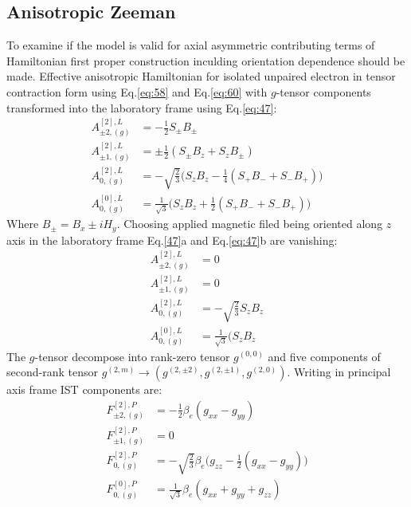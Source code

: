 \subsection{Anisotropic Zeeman}\label{zeemansection}
To examine if the model is valid for axial asymmetric contributing terms of Hamiltonian first proper construction inculding orientation dependence should be made. Effective anisotropic Hamiltonian for isolated unpaired electron in tensor contraction form using Eq.\ref{eq:58} and Eq.\ref{eq:60} with $g$-tensor components transformed into the laboratory frame\cite{NMRtomograph}\cite{Nordio} using Eq.\ref{eq:47}:
\begin{subequations}\label{eq:48}
\begin{align}
A^{[2],L}_{\pm2,(g)} & =-\frac{1}{2}S_{\pm}B_{\pm}\\
A^{[2],L}_{\pm1,(g)} & =\pm\frac{1}{2}(S_{\pm}B_{z}+S_zB_{\pm})\\
A^{[2],L}_{0,(g)} & =-\sqrt{\frac{2}{3}}\big(S_{z}B_{z}-\frac{1}{4}(S_+B_-+S_-B_+)\big)\\
A^{[0],L}_{0,(g)} & =\frac{1}{\sqrt{3}}\big(S_{z}B_{z}+\frac{1}{2}(S_+B_-+S_-B_+)\big)
\end{align}
\end{subequations}
Where $B_{\pm}=B_x\pm iH_y$. Choosing applied magnetic filed being oriented along $z$ axis in the laboratory frame  Eq.\ref{47}a and Eq.\ref{eq:47}b are vanishing: 
\begin{subequations}\label{eq:49}
\begin{align}
A^{[2],L}_{\pm2,(g)} & =0\\
A^{[2],L}_{\pm1,(g)} & =0\\
A^{[2],L}_{0,(g)} & =-\sqrt{\frac{2}{3}}S_{z}B_{z}\\
A^{[0],L}_{0,(g)} & = \frac{1}{\sqrt{3}}(S_{z}B_{z}
\end{align}
\end{subequations}
The $g$-tensor decompose into rank-zero tensor $g^{(0,0)}$ and five components of second-rank tensor $g^{(2,m)}\rightarrow(g^{(2,\pm2)}, g^{(2,\pm1)},g^{(2,0)})$. Writing in principal axis frame IST components are: 
\begin{subequations}\label{eq:50}
\begin{align}
F^{[2],P}_{\pm2,(g)} & =-\frac{1}{2}\beta_e(g_{xx}-g_{yy})\\
F^{[2],P}_{\pm1,(g)} & =0\\
F^{[2],P}_{0,(g)} & =-\sqrt{\frac{2}{3}}\beta_e\big(g_{zz}-\frac{1}{2}(g_{xx}-g_{yy})\big)\\
F^{[0],P}_{0,(g)} & = \frac{1}{\sqrt{3}}\beta_e(g_{xx}+g_{yy}+g_{zz})
\end{align}
\end{subequations}
